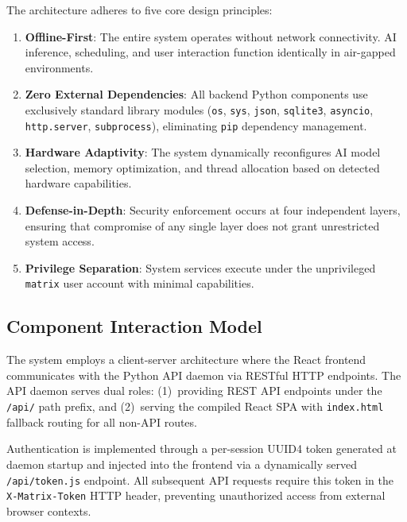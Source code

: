 \documentclass[conference]{IEEEtran}
\begin{document}
The architecture adheres to five core design principles:

\begin{enumerate}[label=\textbf{P\arabic*}:]
    \item \textbf{Offline-First}: The entire system operates without network connectivity. AI inference, scheduling, and user interaction function identically in air-gapped environments.
    
    \item \textbf{Zero External Dependencies}: All backend Python components use exclusively standard library modules (\texttt{os}, \texttt{sys}, \texttt{json}, \texttt{sqlite3}, \texttt{asyncio}, \texttt{http.server}, \texttt{subprocess}), eliminating \texttt{pip} dependency management.
    
    \item \textbf{Hardware Adaptivity}: The system dynamically reconfigures AI model selection, memory optimization, and thread allocation based on detected hardware capabilities.
    
    \item \textbf{Defense-in-Depth}: Security enforcement occurs at four independent layers, ensuring that compromise of any single layer does not grant unrestricted system access.
    
    \item \textbf{Privilege Separation}: System services execute under the unprivileged \texttt{matrix} user account with minimal capabilities.
\end{enumerate}

\subsection{Component Interaction Model}

The system employs a client-server architecture where the React frontend communicates with the Python API daemon via RESTful HTTP endpoints. The API daemon serves dual roles: (1)~providing REST API endpoints under the \texttt{/api/} path prefix, and (2)~serving the compiled React SPA with \texttt{index.html} fallback routing for all non-API routes.

Authentication is implemented through a per-session UUID4 token generated at daemon startup and injected into the frontend via a dynamically served \texttt{/api/token.js} endpoint. All subsequent API requests require this token in the \texttt{X-Matrix-Token} HTTP header, preventing unauthorized access from external browser contexts.
\end{document}
